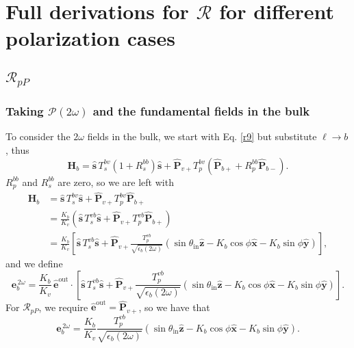\section{Full derivations for \texorpdfstring{$\mathcal{R}$}{R} for different
polarization cases}

\subsection{\texorpdfstring{$\mathcal{R}_{pP}$}{RpP}}


\subsubsection{Taking \texorpdfstring{$\mathcal{P}(2\omega)$}{P(2w)} and the
fundamental fields in the bulk}

To consider the $2\omega$ fields in the bulk, we start with Eq. \eqref{r9} but
substitute $\ell\rightarrow b$, thus
\begin{equation*}
\mathbf{H}_{b}
= \hat{\mathbf{s}}\,T_s^{b v}\left(1+R_{s}^{b b}\right)\hat{\mathbf{s}}
+ \hat{\mathbf{P}}_{v+}T_{p}^{b v}
\left(
\hat{\mathbf{P}}_{b+} + R_{p}^{b b}\hat{\mathbf{P}}_{b-}
\right).
\end{equation*}
$R_{p}^{b b}$ and $R_{s}^{b b}$ are zero, so we are left with
\begin{equation*}
\begin{split}
\mathbf{H}_{b}
&= \hat{\mathbf{s}}\,T_s^{b v}\hat{\mathbf{s}}
 + \hat{\mathbf{P}}_{v+}T_{p}^{b v}\hat{\mathbf{P}}_{b+}\\
&= \frac{K_{b}}{K_{v}}\left(\hat{\mathbf{s}}\,T_s^{vb}\hat{\mathbf{s}}
 + \hat{\mathbf{P}}_{v+}T_{p}^{vb}\hat{\mathbf{P}}_{b+}\right)\\
&= \frac{K_{b}}{K_{v}}
   \left[
   \hat{\mathbf{s}}\,T_s^{vb}\hat{\mathbf{s}}
 + \hat{\mathbf{P}}_{v+}
   \frac{T_{p}^{vb}}{\sqrt{\epsilon_{b}(2\omega)}}
   (\sin\theta_{\mathrm{in}}\hat{\mathbf{z}}
 - K_{b}\cos\phi\hat{\mathbf{x}} 
 - K_{b}\sin\phi\hat{\mathbf{y}})
   \right],
\end{split}
\end{equation*}
and we define
\begin{equation*}
\mathbf{e}^{\,2\omega}_{b}
= \frac{K_{b}}{K_{v}}\,\hat{\mathbf{e}}^{\mathrm{out}}\cdot
\left[
   \hat{\mathbf{s}}\,T_s^{vb}\hat{\mathbf{s}}
 + \hat{\mathbf{P}}_{v+}
   \frac{T_{p}^{vb}}{\sqrt{\epsilon_{b}(2\omega)}}
   (\sin\theta_{\mathrm{in}}\hat{\mathbf{z}}
 - K_{b}\cos\phi\hat{\mathbf{x}} 
 - K_{b}\sin\phi\hat{\mathbf{y}})
   \right].
\end{equation*}
For $\mathcal{R}_{pP}$, we require
$\hat{\mathbf{e}}^{\mathrm{out}}=\hat{\mathbf{P}}_{v+}$, so we have that
\begin{equation*}
\mathbf{e}^{\,2\omega}_{b}
= \frac{K_{b}}{K_{v}}
  \frac{T_{p}^{vb}}{\sqrt{\epsilon_{b}(2\omega)}}
  (\sin\theta_{\mathrm{in}}\hat{\mathbf{z}}
- K_{b}\cos\phi\hat{\mathbf{x}} 
- K_{b}\sin\phi\hat{\mathbf{y}}).
\end{equation*}


